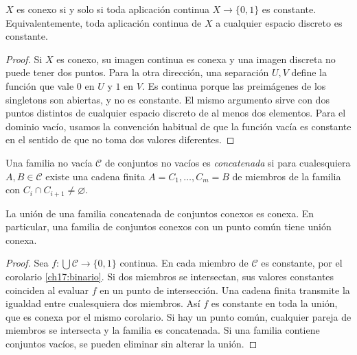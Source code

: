 \begin{corolario}\label{ch17:binario}
$X$ es conexo si y solo si toda aplicación continua $X\to\{0,1\}$ es constante. Equivalentemente, toda aplicación continua de $X$ a cualquier espacio discreto es constante.
\end{corolario}
\begin{proof}
Si $X$ es conexo, su imagen continua es conexa y una imagen discreta no puede tener dos puntos. Para la otra dirección, una separación $U,V$ define la función que vale $0$ en $U$ y $1$ en $V$. Es continua porque las preimágenes de los singletons son abiertas, y no es constante. El mismo argumento sirve con dos puntos distintos de cualquier espacio discreto de al menos dos elementos. Para el dominio vacío, usamos la convención habitual de que la función vacía es constante en el sentido de que no toma dos valores diferentes.
\end{proof}

\begin{definicion}
Una familia no vacía $\mathcal C$ de conjuntos no vacíos es \emph{concatenada} si para cualesquiera $A,B\in\mathcal C$ existe una cadena finita $A=C_1,\ldots,C_m=B$ de miembros de la familia con $C_i\cap C_{i+1}\ne\varnothing$.
\end{definicion}

\begin{proposicion}\label{ch17:union}
La unión de una familia concatenada de conjuntos conexos es conexa. En particular, una familia de conjuntos conexos con un punto común tiene unión conexa.
\end{proposicion}
\begin{proof}
Sea $f:\bigcup\mathcal C\to\{0,1\}$ continua. En cada miembro de $\mathcal C$ es constante, por el corolario \ref{ch17:binario}. Si dos miembros se intersectan, sus valores constantes coinciden al evaluar $f$ en un punto de intersección. Una cadena finita transmite la igualdad entre cualesquiera dos miembros. Así $f$ es constante en toda la unión, que es conexa por el mismo corolario. Si hay un punto común, cualquier pareja de miembros se intersecta y la familia es concatenada. Si una familia contiene conjuntos vacíos, se pueden eliminar sin alterar la unión.
\end{proof}

